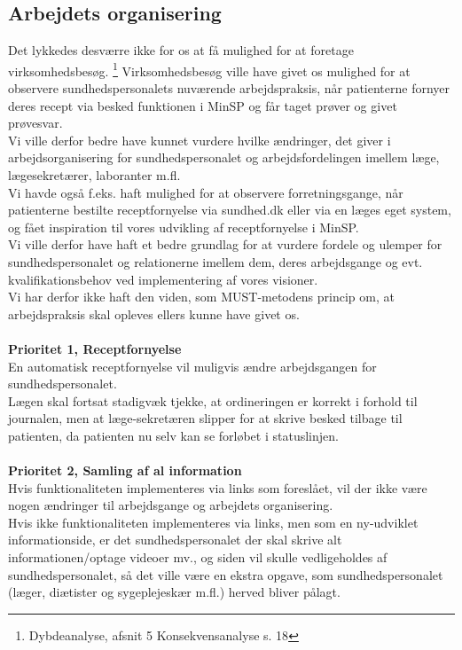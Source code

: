 \subsection{Arbejdets organisering} 
Det lykkedes desværre ikke for os at få mulighed for at foretage virksomhedsbesøg. \footnote{Dybdeanalyse, afsnit 5 Konsekvensanalyse s. 18} Virksomhedsbesøg ville have givet os mulighed for at observere sundhedspersonalets nuværende arbejdspraksis, når patienterne fornyer deres recept via besked funktionen i MinSP og får taget prøver og givet prøvesvar.\\ 
Vi ville derfor bedre have kunnet vurdere hvilke ændringer, det giver i arbejdsorganisering for sundhedspersonalet og arbejdsfordelingen imellem læge, lægesekretærer, laboranter m.fl.\\
Vi havde også f.eks. haft mulighed for at observere forretningsgange, når patienterne bestilte receptfornyelse via sundhed.dk eller via en læges eget system, og fået inspiration til vores udvikling af receptfornyelse i MinSP.\\
Vi ville derfor have haft et bedre grundlag for at vurdere fordele og ulemper for sundhedspersonalet og relationerne imellem dem, deres arbejdsgange og evt. kvalifikationsbehov ved implementering af vores visioner.\\
Vi har derfor ikke haft den viden, som MUST-metodens princip om, at arbejdspraksis skal opleves ellers kunne have givet os. 
\\
\\
\textbf{Prioritet 1, Receptfornyelse} \\
En automatisk receptfornyelse vil muligvis ændre arbejdsgangen for sundhedspersonalet. \\ 
Lægen skal fortsat stadigvæk tjekke, at ordineringen er korrekt i forhold til journalen, men at læge-sekretæren slipper for at skrive besked tilbage til patienten, da patienten nu selv kan se forløbet i statuslinjen.
%
\\\\
\textbf{Prioritet 2, Samling af al information} \\
Hvis funktionaliteten implementeres via links som foreslået, vil der ikke være nogen ændringer til arbejdsgange og arbejdets organisering. \\
Hvis ikke funktionaliteten implementeres via links, men som en ny-udviklet informationside, er det sundhedspersonalet der skal skrive alt informationen/optage videoer mv., og siden vil skulle vedligeholdes af sundhedspersonalet, så det ville være en ekstra opgave, som sundhedspersonalet (læger, diætister og sygeplejeskær m.fl.) herved bliver pålagt.
